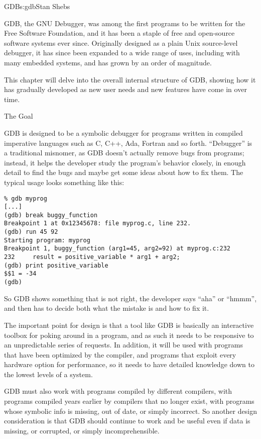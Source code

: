\begin{aosachapter}{GDB}{s:gdb}{Stan Shebs}

GDB, the GNU Debugger, was among the first programs to be written for
the Free Software Foundation, and it has been a staple of free and
open-source software systems ever since.  Originally designed as a
plain Unix source-level debugger, it has since been expanded to a wide
range of uses, including with many embedded systems, and has grown by
an order of magnitude.

This chapter will delve into the overall internal structure of GDB,
showing how it has gradually developed as new user needs and new
features have come in over time.

\begin{aosasect1}{The Goal}

GDB is designed to be a symbolic debugger for programs written in
compiled imperative languages such as C, C++, Ada, Fortran and so
forth.  ``Debugger'' is a traditional misnomer, as GDB doesn't
actually remove bugs from programs; instead, it helps the developer
study the program's behavior closely, in enough detail to find the
bugs and maybe get some ideas about how to fix them.  The typical
usage looks something like this:

\begin{verbatim}
% gdb myprog
[...]
(gdb) break buggy_function
Breakpoint 1 at 0x12345678: file myprog.c, line 232.
(gdb) run 45 92
Starting program: myprog
Breakpoint 1, buggy_function (arg1=45, arg2=92) at myprog.c:232
232     result = positive_variable * arg1 + arg2;
(gdb) print positive_variable
$$1 = -34
(gdb)
\end{verbatim}

So GDB shows something that is not right, the developer says ``aha''
or ``hmmm'', and then has to decide both what the mistake is and how
to fix it.

The important point for design is that a tool like GDB is basically an
interactive toolbox for poking around in a program, and as such it
needs to be responsive to an unpredictable series of requests.  In
addition, it will be used with programs that have been optimized by
the compiler, and programs that exploit every hardware option for
performance, so it needs to have detailed knowledge down to the lowest
levels of a system.

GDB must also work with programs compiled by different compilers,
with programs compiled years earlier by compilers that no longer exist,
with programs whose symbolic info is missing, out of date, or simply
incorrect.  So another design consideration is that GDB should
continue to work and be useful even if data is missing, or corrupted,
or simply incomprehensible.


\end{aosasect1}
\end{aosachapter}
